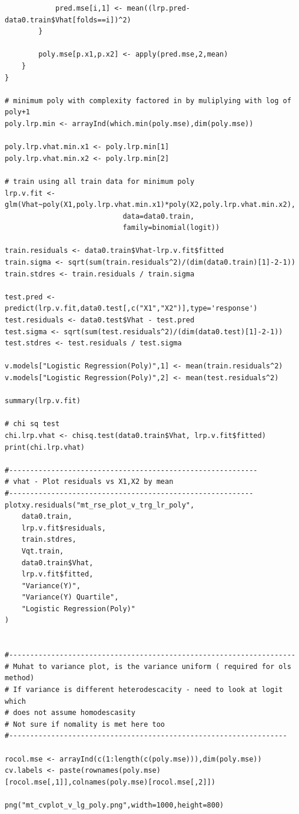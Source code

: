 \documentclass[twoside,12pt]{article}
\begin{document}
\begin{verbatim}
			pred.mse[i,1] <- mean((lrp.pred-data0.train$Vhat[folds==i])^2)
		}

		poly.mse[p.x1,p.x2] <- apply(pred.mse,2,mean)
	}
}

# minimum poly with complexity factored in by muliplying with log of poly+1
poly.lrp.min <- arrayInd(which.min(poly.mse),dim(poly.mse))

poly.lrp.vhat.min.x1 <- poly.lrp.min[1]
poly.lrp.vhat.min.x2 <- poly.lrp.min[2]

# train using all train data for minimum poly
lrp.v.fit <- glm(Vhat~poly(X1,poly.lrp.vhat.min.x1)*poly(X2,poly.lrp.vhat.min.x2),
							data=data0.train,
							family=binomial(logit))

train.residuals <- data0.train$Vhat-lrp.v.fit$fitted
train.sigma <- sqrt(sum(train.residuals^2)/(dim(data0.train)[1]-2-1))
train.stdres <- train.residuals / train.sigma

test.pred <- predict(lrp.v.fit,data0.test[,c("X1","X2")],type='response')
test.residuals <- data0.test$Vhat - test.pred
test.sigma <- sqrt(sum(test.residuals^2)/(dim(data0.test)[1]-2-1))
test.stdres <- test.residuals / test.sigma

v.models["Logistic Regression(Poly)",1] <- mean(train.residuals^2)
v.models["Logistic Regression(Poly)",2] <- mean(test.residuals^2)

summary(lrp.v.fit)

# chi sq test
chi.lrp.vhat <- chisq.test(data0.train$Vhat, lrp.v.fit$fitted)
print(chi.lrp.vhat)

#-----------------------------------------------------------
# vhat - Plot residuals vs X1,X2 by mean
#----------------------------------------------------------
plotxy.residuals("mt_rse_plot_v_trg_lr_poly",
	data0.train,
	lrp.v.fit$residuals,
	train.stdres,
	Vqt.train,
	data0.train$Vhat,
	lrp.v.fit$fitted,
	"Variance(Y)",
	"Variance(Y) Quartile",
	"Logistic Regression(Poly)"
)


#--------------------------------------------------------------------
# Muhat to variance plot, is the variance uniform ( required for ols method)
# If variance is different heterodescacity - need to look at logit which
# does not assume homodescasity
# Not sure if nomality is met here too
#------------------------------------------------------------------

rocol.mse <- arrayInd(c(1:length(c(poly.mse))),dim(poly.mse))
cv.labels <- paste(rownames(poly.mse)[rocol.mse[,1]],colnames(poly.mse)[rocol.mse[,2]])

png("mt_cvplot_v_lg_poly.png",width=1000,height=800)


\end{verbatim}
\end{document}
